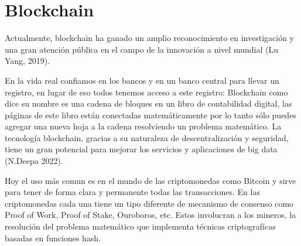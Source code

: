 \documentclass[conference]{IEEEtran}
\begin{document}
\section{Blockchain}

Actualmente, blockchain ha ganado un amplio reconocimiento en investigación y una
gran atención pública en el campo de la innovación a nivel mundial (Lu Yang, 2019).

En la vida real confiamos en los bancos y en un banco central para llevar un registro, 
en lugar de eso todos tenemos acceso a este registro: Blockchain como dice su nombre es 
una cadena de bloques en un libro de contabilidad digital, las páginas de este libro están 
conectadas matemáticamente por lo tanto sólo puedes agregar una nueva hoja a la cadena 
resolviendo un problema matemático. La tecnología blockchain, gracias a su naturaleza de 
descentralización y seguridad, tiene un gran potencial para mejorar los servicios y aplicaciones de big data (N.Deepa 2022). 

Hoy el uso más comun es en el mundo de las criptomonedas como Bitcoin y sirve para tener de forma clara y permanente 
todas las transacciones. En las criptomonedas cada una tiene un tipo diferente de mecanismo de 
consenso como Proof of Work, Proof of Stake, Ouroboros, etc. Estos involucran a los mineros, 
la resolución del problema matemático que implementa técnicas criptografícas basadas en funciones hash.
\end{document}
